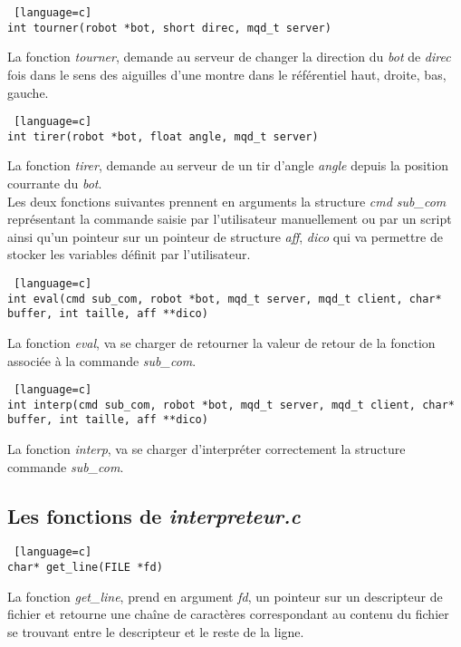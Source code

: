 \documentclass[a4paper, 11pt]{article}
\begin{document}
\begin {lstlisting} [language=c]
int tourner(robot *bot, short direc, mqd_t server)
\end{lstlisting}
La fonction \emph{tourner}, demande au serveur de changer la direction du \emph{bot} de \emph{direc} fois dans le sens des aiguilles d'une montre dans le référentiel haut, droite, bas, gauche.\\

\begin {lstlisting} [language=c]
int tirer(robot *bot, float angle, mqd_t server)
\end{lstlisting}
La fonction \emph{tirer}, demande au serveur de un tir d'angle \emph{angle} depuis la position courrante du  \emph{bot}.\\

Les deux fonctions suivantes prennent en arguments la structure \emph{cmd sub\_com} représentant la commande saisie par l'utilisateur manuellement ou par un script ainsi qu'un pointeur sur un pointeur de structure \emph{aff}, \emph{dico} qui va permettre de stocker les variables définit par l'utilisateur.\\

\begin {lstlisting} [language=c]
int eval(cmd sub_com, robot *bot, mqd_t server, mqd_t client, char* buffer, int taille, aff **dico)
\end{lstlisting}
La fonction \emph{eval}, va se charger de retourner la valeur de retour de la fonction associée à la commande \emph{sub\_com}.\\

\begin {lstlisting} [language=c]
int interp(cmd sub_com, robot *bot, mqd_t server, mqd_t client, char* buffer, int taille, aff **dico)
\end{lstlisting}
La fonction \emph{interp}, va se charger d'interpréter correctement la structure commande \emph{sub\_com}.\\

\subsection{Les fonctions de \emph{interpreteur.c}}
\begin {lstlisting} [language=c]
char* get_line(FILE *fd)
\end{lstlisting}
La fonction \emph{get\_line}, prend en argument \emph{fd}, un pointeur sur un descripteur de fichier et retourne une chaîne de caractères correspondant au contenu du fichier se trouvant entre le descripteur et le reste de la ligne.\\
\end{document}
